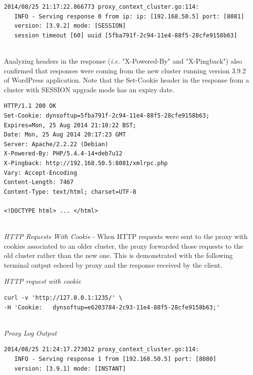 \documentclass[a4paper,11pt,twoside]{report}
\begin{document}

\begin{lstlisting}[language=terminal]
2014/08/25 21:17:22.866773 proxy_context_cluster.go:114:     
   INFO - Serving response 0 from ip: ip: [192.168.50.5] port: [8081] 
   version: [3.9.2] mode: [SESSION] 
   session timeout [60] uuid [5fba791f-2c94-11e4-88f5-28cfe9158b63]
\end{lstlisting}

\noindent\\
Analyzing headers in the response (\textit{i.e.} "X-Powered-By" and "X-Pingback") also confirmed that responses were coming from the new cluster running version 3.9.2 of WordPress application. Note that the Set-Cookie header in the response from a cluster with SESSION upgrade mode has an expiry date. \smallskip 

\begin{lstlisting}[language=terminal]
HTTP/1.1 200 OK
Set-Cookie: dynsoftup=5fba791f-2c94-11e4-88f5-28cfe9158b63; Expires=Mon, 25 Aug 2014 21:18:22 BST;
Date: Mon, 25 Aug 2014 20:17:23 GMT
Server: Apache/2.2.22 (Debian)
X-Powered-By: PHP/5.4.4-14+deb7u12
X-Pingback: http://192.168.50.5:8081/xmlrpc.php
Vary: Accept-Encoding
Content-Length: 7467
Content-Type: text/html; charset=UTF-8

<!DOCTYPE html> ... </html>
\end{lstlisting}

\noindent\\
\textit{HTTP Requests With Cookie} - When HTTP requests were sent to the proxy with cookies  associated to an older cluster, the proxy forwarded those requests to the old cluster rather than the new one. This is demonstrated with the following terminal output echoed by proxy and the response received by the client. \medskip 

\noindent
\textit{HTTP request with cookie}
\begin{lstlisting}[language=terminal]
curl -v 'http://127.0.0.1:1235/' \
-H 'Cookie:   dynsoftup=e6203784-2c93-11e4-88f5-28cfe9158b63;'
\end{lstlisting}

\noindent\\
\textit{Proxy Log Output}
\begin{lstlisting}[language=terminal]
2014/08/25 21:24:17.273012 proxy_context_cluster.go:114:     
   INFO - Serving response 1 from [192.168.50.5] port: [8080] 
   version: [3.9.1] mode: [INSTANT]
\end{lstlisting}
\end{document}

